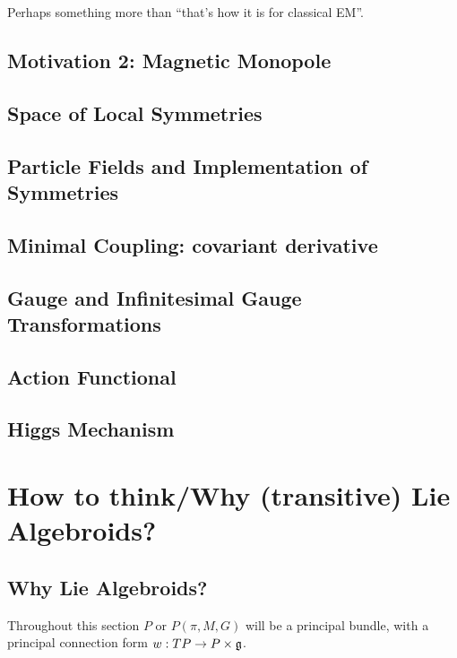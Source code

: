  Perhaps something more than ``that's how it is for classical EM''.

\subsection{Motivation 2: Magnetic Monopole}

\subsection{Space of Local Symmetries}

\subsection{Particle Fields and Implementation of Symmetries}

\subsection{Minimal Coupling: covariant derivative}

\subsection{Gauge and Infinitesimal Gauge Transformations}

\subsection{Action Functional}

\subsection{Higgs Mechanism}

\section{How to think/Why (transitive) Lie Algebroids?}




\subsection{Why Lie Algebroids?}
Throughout this section $P$ or $P(\pi, M, G)$ will be a principal bundle, with a principal connection form $w : TP \to P \times \mathfrak{g}$.  

